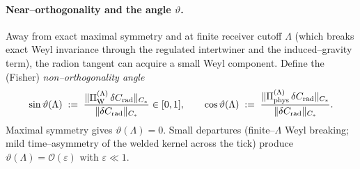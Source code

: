 \documentclass[10pt]{article}
\theoremstyle{definition}
\theoremstyle{plain}
\begin{document}
\paragraph{Near–orthogonality and the angle $\vartheta$.}\label{par:uom-main-120}
Away from exact maximal symmetry and at finite receiver cutoff $\Lambda$ (which breaks exact Weyl
invariance through the regulated intertwiner and the induced–gravity term), the radion tangent can
acquire a small Weyl component. Define the (Fisher) \emph{non–orthogonality angle}
\begin{equation}
\label{eq:angle-def}
\sin\vartheta(\Lambda)\;:=\;
\frac{\|\Pi_{\rm W}^{(\Lambda)}\,\delta C_{\rm rad}\|_{C_\ast}}
     {\|\delta C_{\rm rad}\|_{C_\ast}}\in[0,1],\qquad
\cos\vartheta(\Lambda)\;:=\;
\frac{\|\Pi_{\rm phys}^{(\Lambda)}\,\delta C_{\rm rad}\|_{C_\ast}}
     {\|\delta C_{\rm rad}\|_{C_\ast}}.
\end{equation}
Maximal symmetry gives $\vartheta( \Lambda)\!=\!0$. Small departures (finite–$\Lambda$ Weyl
breaking; mild time–asymmetry of the welded kernel across the tick) produce $\vartheta(\Lambda)
=\mathcal O(\varepsilon)$ with $\varepsilon\ll1$.
\end{document}
